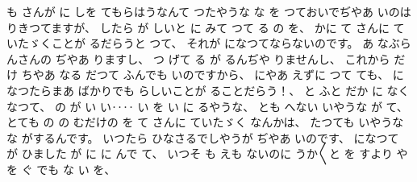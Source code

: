 %
も
さんが
に
しを
てもらはうなんて
つたやうな
な
を
つておいでぢやあ
いのは
りきつてますが、
%
したら
が
しいと
に
みて
つて
る
の
を、
%
かに
て
さんに
ていたゞくことが
るだらうと
つて、
%
それが
になつてならないのです。
%
あ
なぶらんさんの
ぢやあ
りますし、
%
つ
げて
る
が
るんぢや
りませんし、
%
これから
だけ
ちやあ
なる
だつて
ふんでも
いのですから、
%
にやあ
えずに
つて
ても、
%
になつたらまあ
ばかりでも
らしいことが
ることだらう！、
%
と
ふと
だか
に
なくなつて、
%
の
が
い
い‥‥
い
を
い
に
るやうな、
%
とも
へない
いやうな
が
て、
%
とても
の
の
むだけの
を
て
さんに
ていたゞく
なんかは、
%
たつても
いやうな
な
がするんです。
%
いつたら
ひなさるでしやうが
ぢやあ
いのです、
%
になつて
が
ひました
が
に
に
んで
て、
%
いつそ
も
えも
ないのに
うか〳〵と
を
すより
や
を
ぐ
でも
な
い
を、
